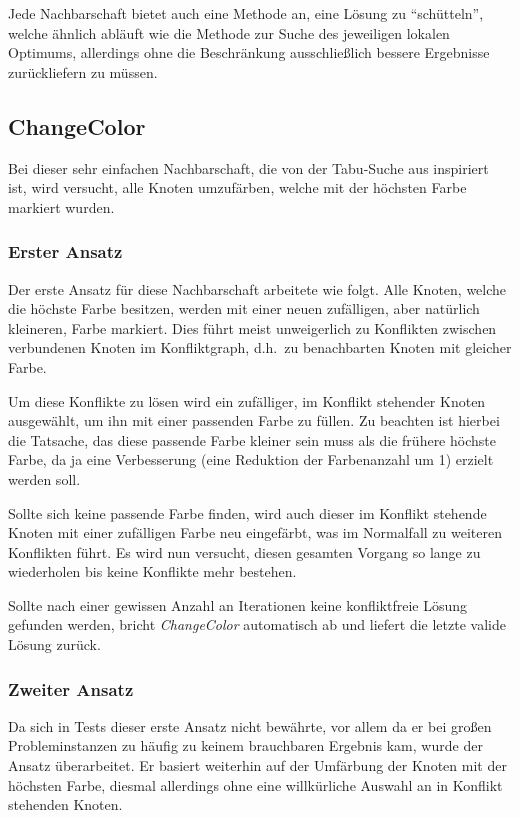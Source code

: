 Jede Nachbarschaft bietet auch eine Methode an, eine Lösung zu ``schütteln'', welche ähnlich abläuft wie die Methode zur Suche des jeweiligen lokalen Optimums, allerdings ohne die Beschränkung ausschließlich bessere Ergebnisse zurückliefern zu müssen.

\subsection{ChangeColor}
\label{sec:changecolor}
Bei dieser sehr einfachen Nachbarschaft, die von der Tabu-Suche aus \citet*{Noronha2006} inspiriert ist, wird versucht, alle Knoten umzufärben, welche mit der höchsten Farbe markiert wurden. 

\subsubsection{Erster Ansatz}
Der erste Ansatz für diese Nachbarschaft arbeitete wie folgt.
Alle Knoten, welche die höchste Farbe besitzen, werden mit einer neuen zufälligen, aber natürlich kleineren, Farbe markiert. Dies führt meist unweigerlich zu Konflikten zwischen verbundenen Knoten im Konfliktgraph, d.h.\ zu benachbarten Knoten mit gleicher Farbe. 

Um diese Konflikte zu lösen wird ein zufälliger, im Konflikt stehender Knoten ausgewählt, um ihn mit einer passenden Farbe zu füllen. Zu beachten ist hierbei die Tatsache, das diese passende Farbe kleiner sein muss als die frühere höchste Farbe, da ja eine Verbesserung (eine Reduktion der Farbenanzahl um 1) erzielt werden soll.

Sollte sich keine passende Farbe finden, wird auch dieser im Konflikt stehende Knoten mit einer zufälligen Farbe neu eingefärbt, was im Normalfall zu weiteren Konflikten führt. Es wird nun versucht, diesen gesamten Vorgang so lange zu wiederholen bis keine Konflikte mehr bestehen. 

Sollte nach einer gewissen Anzahl an Iterationen keine konfliktfreie Lösung gefunden werden, bricht \emph{ChangeColor} automatisch ab und liefert die letzte valide Lösung zurück.

\subsubsection{Zweiter Ansatz}
Da sich in Tests dieser erste Ansatz nicht bewährte, vor allem da er bei großen Probleminstanzen zu häufig zu keinem brauchbaren Ergebnis kam, wurde der Ansatz überarbeitet. Er basiert weiterhin auf der Umfärbung der
Knoten mit der höchsten Farbe, diesmal allerdings ohne eine willkürliche Auswahl an in Konflikt stehenden Knoten.

